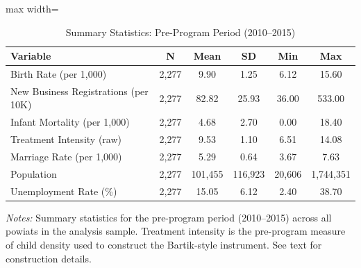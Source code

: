 \begin{table}[htbp]
\centering
\caption{Summary Statistics: Pre-Program Period (2010--2015)}
\label{tab:summary}
\begin{threeparttable}
\begin{adjustbox}{max width=\textwidth}
\begin{tabular}{lccccc}
\toprule
Variable & N & Mean & SD & Min & Max \\
\midrule
Birth Rate (per 1,000) & 2,277 & 9.90 & 1.25 & 6.12 & 15.60 \\
New Business Registrations (per 10K) & 2,277 & 82.82 & 25.93 & 36.00 & 533.00 \\
Infant Mortality (per 1,000) & 2,277 & 4.68 & 2.70 & 0.00 & 18.40 \\
Treatment Intensity (raw) & 2,277 & 9.53 & 1.10 & 6.51 & 14.08 \\
Marriage Rate (per 1,000) & 2,277 & 5.29 & 0.64 & 3.67 & 7.63 \\
Population & 2,277 & 101,455 & 116,923 & 20,606 & 1,744,351 \\
Unemployment Rate (\%) & 2,277 & 15.05 & 6.12 & 2.40 & 38.70 \\
\bottomrule
\end{tabular}
\end{adjustbox}
\begin{tablenotes}[flushleft]\small
\item \textit{Notes:} Summary statistics for the pre-program period (2010--2015) across all powiats in the analysis sample. Treatment intensity is the pre-program measure of child density used to construct the Bartik-style instrument. See text for construction details.
\end{tablenotes}
\end{threeparttable}
\end{table}
